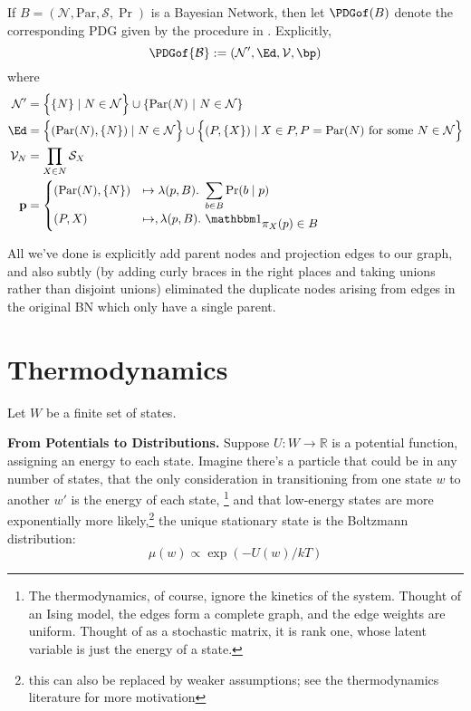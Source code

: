 {\begin{defn} \label{def:bnconvert-formal}
	If $B = (\mathcal N, \mathrm{Par}, \mathcal S, \Pr)$ is a Bayesian Network, then let $\PDGof (B)$ denote the corresponding PDG given by the procedure in . Explicitly, 
	\[ \PDGof{{\mathcal B}} :=  (\mathcal N', \Ed, \mathcal V,
			\bp) \] 
	where %
	\begin{align*}
	\mathcal N' &=  \left\{ \Big.\{N\} \mid N \in \mathcal N\right\} \cup \left\{ \mathrm{Par}(N) ~\middle|~ N \in \cal N \right\} \\%
	\Ed &= \left\{ \vphantom{\Big|}(\mathrm{Par}(N), \{N\}) \mid N \in \mathcal N \right\} \cup 
	\left\{\vphantom{\Big|} (P, \{X\}) \mid X \in P, P = \mathrm{Par}(N) \text{ for some }N \in \mathcal N \right\} \\
	\mathcal V_N &= \prod_{X \in N} \mathcal S_X \\
	\mathbf p &= \begin{cases}
	(\mathrm{Par}(N), \{N\}) &\mapsto \lambda(p, B).~ \displaystyle\sum_{b \in  B} \Pr(b \mid p) \\
	(P, X) &\mapsto, \lambda (p, B).~ \displaystyle \mathbbm 1_{\displaystyle\pi_X(p) \in B}
	\end{cases}
	\end{align*}
\end{defn}
All we've done is explicitly add parent nodes and projection edges to our graph, and also subtly (by adding curly braces in the right places and taking unions rather than disjoint unions) eliminated the duplicate nodes arising from edges in the original BN which only have a single parent.

\section{Thermodynamics}\label{sec:thermo-background}
Let $W$ be a finite set of states.

\textbf{From Potentials to Distributions.}
Suppose $U: W \to \mathbb R$ is a potential function, assigning an energy to each state. Imagine there's a particle that could be in any number of states, that the only consideration in transitioning from one state $w$ to another $w'$ is the energy of each state,%
	\footnote{The thermodynamics, of course, ignore the kinetics of the system. Thought of an Ising model, the edges form a complete graph, and the edge weights are uniform. Thought of as a stochastic matrix, it is rank one, whose latent variable is just the energy of a state.}
and that low-energy states are more exponentially more likely,\footnote{this can also be replaced by weaker assumptions; see the thermodynamics literature for more motivation}
the unique stationary state is the Boltzmann distribution:
\begin{equation}
	 \mu(w) \propto \exp( - U(w) / kT ) \label{eq:boltzmann-appendix}
\end{equation}

}
